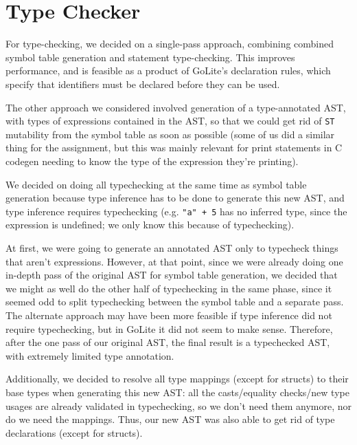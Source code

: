 \documentclass[11pt]{article}
\begin{document}
\section{Type Checker}
\label{sec:org5ddbc2e}
For type-checking, we decided on a single-pass approach, combining
combined symbol table generation and statement type-checking. This
improves performance, and is feasible as a product of GoLite's
declaration rules, which specify that identifiers must be declared
before they can be used.

The other approach we considered involved generation of a
type-annotated AST, with types of expressions contained in the AST,
so that we could get rid of \texttt{ST} mutability from the symbol table as
soon as possible (some of us did a similar thing for the assignment,
but this was mainly relevant for print statements in C codegen
needing to know the type of the expression they're printing).

We decided on doing all typechecking at the same time as symbol
table generation because type inference has to be done to generate
this new AST, and type inference requires typechecking (e.g. \texttt{"a" +
  5} has no inferred type, since the expression is undefined; we only
know this because of typechecking).

At first, we were going to generate an annotated AST only to
typecheck things that aren't expressions. However, at that point,
since we were already doing one in-depth pass of the original AST
for symbol table generation, we decided that we might as well do the
other half of typechecking in the same phase, since it seemed odd to
split typechecking between the symbol table and a separate pass. The
alternate approach may have been more feasible if type inference did
not require typechecking, but in GoLite it did not seem to make
sense. Therefore, after the one pass of our original AST, the final
result is a typechecked AST, with extremely limited type annotation.

Additionally, we decided to resolve all type mappings (except for
structs) to their base types when generating this new AST: all the
casts/equality checks/new type usages are already validated in
typechecking, so we don't need them anymore, nor do we need the
mappings. Thus, our new AST was also able to get rid of type
declarations (except for structs).
\end{document}
